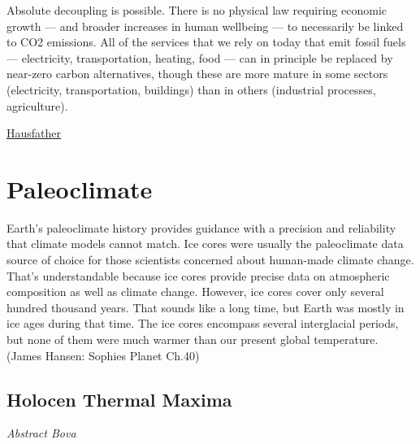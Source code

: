 \documentclass[
]{book}
\begin{document}
Absolute decoupling is possible. There is no physical law requiring economic growth --- and broader increases in human wellbeing --- to necessarily be linked to CO2 emissions. All of the services that we rely on today that emit fossil fuels --- electricity, transportation, heating, food --- can in principle be replaced by near-zero carbon alternatives, though these are more mature in some sectors (electricity, transportation, buildings) than in others (industrial processes, agriculture).

\href{https://thebreakthrough.org/issues/energy/absolute-decoupling-of-economic-growth-and-emissions-in-32-countries}{Hausfather}

\hypertarget{paleoclimate}{%
\chapter{Paleoclimate}\label{paleoclimate}}

Earth's paleoclimate history provides guidance with a precision and reliability that climate
models cannot match. Ice cores were usually the paleoclimate data source of choice for those
scientists concerned about human-made climate change. That's understandable because ice
cores provide precise data on atmospheric composition as well as climate change.
However, ice cores cover only several hundred thousand years. That sounds like a long time, but
Earth was mostly in ice ages during that time. The ice cores encompass several interglacial
periods, but none of them were much warmer than our present global temperature.
(James Hansen: Sophies Planet Ch.40)

\hypertarget{holocen-thermal-maxima}{%
\section{Holocen Thermal Maxima}\label{holocen-thermal-maxima}}

\emph{Abstract Bova}
\end{document}
